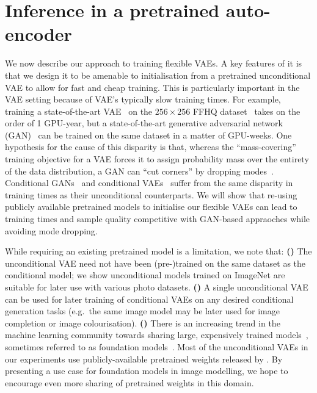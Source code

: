 \section{Inference in a pretrained auto-encoder}
\label{sec:ipa}

We now describe our approach to training flexible VAEs. A key features of it is that we design it to be amenable to initialisation from a pretrained unconditional VAE to allow for fast and cheap training.  This is particularly important in the VAE setting because of VAE's typically slow training times. For example,
training a state-of-the-art VAE~\citep{vahdat2020nvae,child2020very} on the
$256\times256$ FFHQ dataset~\citep{karras2019style} takes on the order of 1
GPU-year, but a state-of-the-art generative adversarial network
(GAN)~\citep{lin2021anycost,karras2020analyzing} can be trained on the same
dataset in a matter of GPU-weeks. One hypothesis for the cause of this disparity
is that, whereas the ``mass-covering'' training objective for a VAE forces it to
assign probability mass over the entirety of the data distribution, a GAN can
``cut corners'' by dropping modes~\citep{arora2017gans,arora2017generalization}. Conditional GANs~\citep{zheng2019pluralistic,zhao2021large} and conditional VAEs~\citep{sohn2015learning,ivanov2018variational} suffer from the same disparity in training times as their unconditional counterparts. We will show that re-using publicly available pretrained models to initialise our flexible VAEs can lead to training times and sample quality competitive with GAN-based appraoches while avoiding mode dropping.



While requiring an existing pretrained model is a limitation, we note that:
\textbf{()} The unconditional VAE need not have been (pre-)trained on the same dataset as the conditional model; we show unconditional models trained on
ImageNet are suitable for later use with various photo datasets.
\textbf{()} A single unconditional VAE can be used for later training of
conditional VAEs on any desired conditional generation tasks (e.g.~the same
image model may be later used for image completion or image colourisation).
\textbf{()} There is an increasing trend in the machine learning community towards
sharing large, expensively trained models~\citep{wolf2020transformers},
sometimes referred to as foundation models~\citep{bommasani2021opportunities}.
Most of the unconditional VAEs in our experiments use publicly-available
pretrained weights released by \citet{child2020very}. By presenting a use case
for foundation models in image modelling, we hope to encourage even more sharing
of pretrained weights in this domain.

